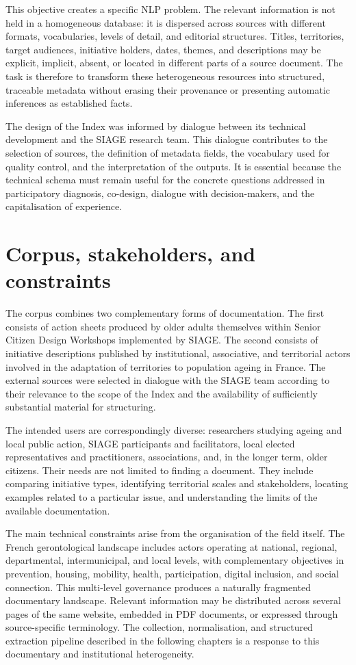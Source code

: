 \documentclass[
11pt,
english,
singlespacing,
headsepline,
]{MastersDoctoralThesis}
\begin{document}
This objective creates a specific NLP problem. The relevant information is not
held in a homogeneous database: it is dispersed across sources with different
formats, vocabularies, levels of detail, and editorial structures. Titles,
territories, target audiences, initiative holders, dates, themes, and descriptions
may be explicit, implicit, absent, or located in different parts of a source
document. The task is therefore to transform these heterogeneous resources into
structured, traceable metadata without erasing their provenance or presenting
automatic inferences as established facts.

The design of the Index was informed by dialogue between its technical development
and the SIAGE research team. This dialogue contributes to the selection of sources,
the definition of metadata fields, the vocabulary used for quality control, and the
interpretation of the outputs. It is essential because the technical schema must
remain useful for the concrete questions addressed in participatory diagnosis,
co-design, dialogue with decision-makers, and the capitalisation of experience.

\section{Corpus, stakeholders, and constraints}

The corpus combines two complementary forms of documentation. The first consists
of action sheets produced by older adults themselves within Senior Citizen Design
Workshops implemented by SIAGE. The second consists of initiative descriptions
published by institutional, associative, and territorial actors involved in the
adaptation of territories to population ageing in France. The external sources were
selected in dialogue with the SIAGE team according to their relevance to the scope
of the Index and the availability of sufficiently substantial material for
structuring.

The intended users are correspondingly diverse: researchers studying ageing and
local public action, SIAGE participants and facilitators, local elected
representatives and practitioners, associations, and, in the longer term, older
citizens. Their needs are not limited to finding a document. They include comparing
initiative types, identifying territorial scales and stakeholders, locating examples
related to a particular issue, and understanding the limits of the available
documentation.

The main technical constraints arise from the organisation of the field itself.
The French gerontological landscape includes actors operating at national,
regional, departmental, intermunicipal, and local levels, with complementary
objectives in prevention, housing, mobility, health, participation, digital
inclusion, and social connection. This multi-level governance produces a naturally
fragmented documentary landscape. Relevant information may be distributed across
several pages of the same website, embedded in PDF documents, or expressed through
source-specific terminology. The collection, normalisation, and structured
extraction pipeline described in the following chapters is a response to this
documentary and institutional heterogeneity.
\end{document}
